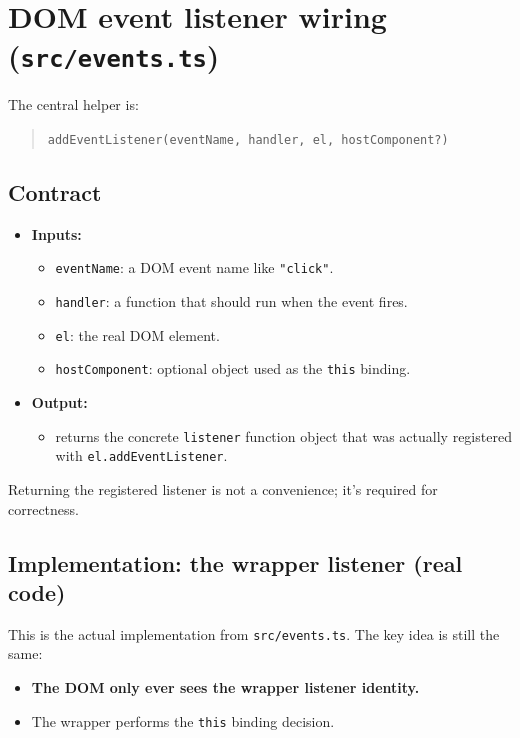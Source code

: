 \section{DOM event listener wiring (\texttt{src/events.ts})}
The central helper is:

\begin{quote}
	\texttt{addEventListener(eventName, handler, el, hostComponent?)}
\end{quote}

\subsection{Contract}
\begin{itemize}
  \item \textbf{Inputs:}
    \begin{itemize}
      \item \texttt{eventName}: a DOM event name like \texttt{"click"}.
      \item \texttt{handler}: a function that should run when the event fires.
      \item \texttt{el}: the real DOM element.
      \item \texttt{hostComponent}: optional object used as the \texttt{this} binding.
    \end{itemize}
  \item \textbf{Output:}
    \begin{itemize}
      \item returns the concrete \texttt{listener} function object that was actually registered with \texttt{el.addEventListener}.
    \end{itemize}
\end{itemize}

Returning the registered listener is not a convenience; it's required for correctness.

\subsection{Implementation: the wrapper listener (real code)}
This is the actual implementation from \texttt{src/events.ts}. The key idea is still the same:

\begin{itemize}
  \item \textbf{The DOM only ever sees the wrapper listener identity.}
  \item The wrapper performs the \texttt{this} binding decision.
\end{itemize}

